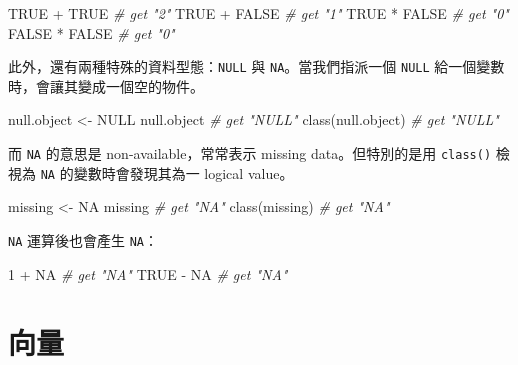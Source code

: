 \documentclass[
]{book}
\newenvironment{Shaded}{\begin{snugshade}}{\end{snugshade}}
\newcommand{\CommentTok}[1]{\textcolor[rgb]{0.56,0.35,0.01}{\textit{#1}}}
\newcommand{\ConstantTok}[1]{\textcolor[rgb]{0.00,0.00,0.00}{#1}}
\newcommand{\DecValTok}[1]{\textcolor[rgb]{0.00,0.00,0.81}{#1}}
\newcommand{\FunctionTok}[1]{\textcolor[rgb]{0.00,0.00,0.00}{#1}}
\newcommand{\NormalTok}[1]{#1}
\newcommand{\OtherTok}[1]{\textcolor[rgb]{0.56,0.35,0.01}{#1}}
\newcommand{\SpecialCharTok}[1]{\textcolor[rgb]{0.00,0.00,0.00}{#1}}
\theoremstyle{definition}
\theoremstyle{remark}
\begin{document}
\begin{Shaded}
\begin{Highlighting}[]
\ConstantTok{TRUE} \SpecialCharTok{+} \ConstantTok{TRUE}  \CommentTok{\# get "2"}
\ConstantTok{TRUE} \SpecialCharTok{+} \ConstantTok{FALSE}  \CommentTok{\# get "1"}
\ConstantTok{TRUE} \SpecialCharTok{*} \ConstantTok{FALSE}  \CommentTok{\# get "0"}
\ConstantTok{FALSE} \SpecialCharTok{*} \ConstantTok{FALSE}  \CommentTok{\# get "0"}
\end{Highlighting}
\end{Shaded}

此外，還有兩種特殊的資料型態：\texttt{NULL} 與 \texttt{NA}。當我們指派一個 \texttt{NULL} 給一個變數時，會讓其變成一個空的物件。

\begin{Shaded}
\begin{Highlighting}[]
\NormalTok{null.object }\OtherTok{\textless{}{-}} \ConstantTok{NULL}
\NormalTok{null.object  }\CommentTok{\# get "NULL"}
\FunctionTok{class}\NormalTok{(null.object)  }\CommentTok{\# get "\textquotesingle{}NULL\textquotesingle{}"}
\end{Highlighting}
\end{Shaded}

而 \texttt{NA} 的意思是 non-available，常常表示 missing data。但特別的是用 \texttt{class()} 檢視為 \texttt{NA} 的變數時會發現其為一 logical value。

\begin{Shaded}
\begin{Highlighting}[]
\NormalTok{missing }\OtherTok{\textless{}{-}} \ConstantTok{NA}
\NormalTok{missing  }\CommentTok{\# get "NA"}
\FunctionTok{class}\NormalTok{(missing)  }\CommentTok{\# get "\textquotesingle{}NA\textquotesingle{}"}
\end{Highlighting}
\end{Shaded}

\texttt{NA} 運算後也會產生 \texttt{NA}：

\begin{Shaded}
\begin{Highlighting}[]
\DecValTok{1} \SpecialCharTok{+} \ConstantTok{NA}  \CommentTok{\# get "NA"}
\ConstantTok{TRUE} \SpecialCharTok{{-}} \ConstantTok{NA}  \CommentTok{\# get "NA"}
\end{Highlighting}
\end{Shaded}

\hypertarget{ux5411ux91cf}{%
\section{向量}\label{ux5411ux91cf}}
\end{document}

